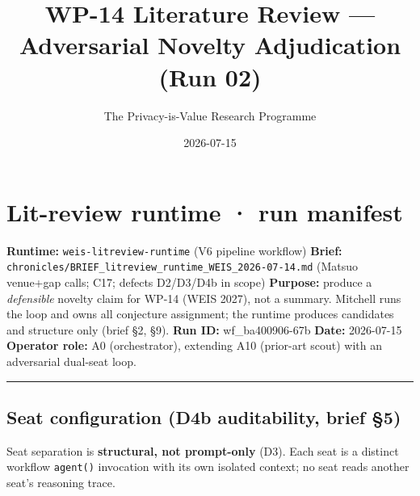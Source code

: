 \documentclass[
  11pt,
]{article}
\title{WP-14 Literature Review --- Adversarial Novelty Adjudication (Run
02)}
\author{The Privacy-is-Value Research Programme}
\date{2026-07-15}
\begin{document}
\maketitle

\section{Lit-review runtime · run
manifest}\label{lit-review-runtime-run-manifest}

\textbf{Runtime:} \texttt{weis-litreview-runtime} (V6 pipeline workflow)
\textbf{Brief:}
\texttt{chronicles/BRIEF\_litreview\_runtime\_WEIS\_2026-07-14.md}
(Matsuo venue+gap calls; C17; defects D2/D3/D4b in scope)
\textbf{Purpose:} produce a \emph{defensible} novelty claim for WP-14
(WEIS 2027), not a summary. Mitchell runs the loop and owns all
conjecture assignment; the runtime produces candidates and structure
only (brief §2, §9). \textbf{Run ID:} wf\_ba400906-67b \textbf{Date:}
2026-07-15 \textbf{Operator role:} A0 (orchestrator), extending A10
(prior-art scout) with an adversarial dual-seat loop.

\begin{center}\rule{0.5\linewidth}{0.5pt}\end{center}

\subsection{Seat configuration (D4b auditability, brief
§5)}\label{seat-configuration-d4b-auditability-brief-5}

Seat separation is \textbf{structural, not prompt-only} (D3). Each seat
is a distinct workflow \texttt{agent()} invocation with its own isolated
context; no seat reads another seat's reasoning trace.
\end{document}
